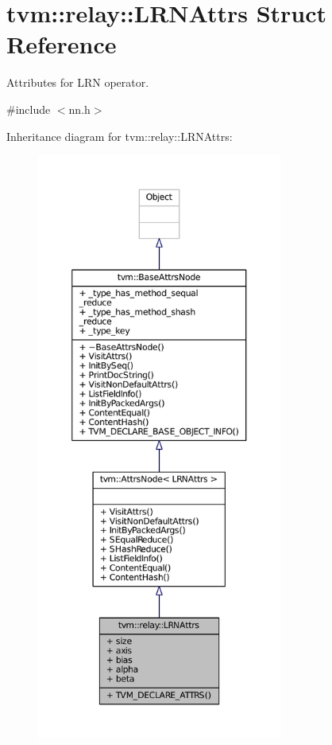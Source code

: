 \hypertarget{structtvm_1_1relay_1_1LRNAttrs}{}\section{tvm\+:\+:relay\+:\+:L\+R\+N\+Attrs Struct Reference}
\label{structtvm_1_1relay_1_1LRNAttrs}


Attributes for L\+RN operator.  




{\ttfamily \#include $<$nn.\+h$>$}



Inheritance diagram for tvm\+:\+:relay\+:\+:L\+R\+N\+Attrs\+:
\nopagebreak
\begin{figure}[H]
\begin{center}
\leavevmode
\includegraphics[height=550pt]{structtvm_1_1relay_1_1LRNAttrs__inherit__graph}
\end{center}
\end{figure}


